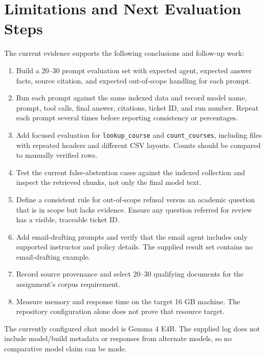 \documentclass[11pt,a4paper]{article}
\begin{document}
\section{Limitations and Next Evaluation Steps}
The current evidence supports the following conclusions and follow-up work:
\begin{enumerate}
  \item Build a 20--30 prompt evaluation set with expected agent, expected answer facts, source citation, and expected out-of-scope handling for each prompt.
  \item Run each prompt against the same indexed data and record model name, prompt, tool calls, final answer, citations, ticket ID, and run number. Repeat each prompt several times before reporting consistency or percentages.
  \item Add focused evaluation for \texttt{lookup\_course} and \texttt{count\_courses}, including files with repeated headers and different CSV layouts. Counts should be compared to manually verified rows.
  \item Test the current false-abstention cases against the indexed collection and inspect the retrieved chunks, not only the final model text.
  \item Define a consistent rule for out-of-scope refusal versus an academic question that is in scope but lacks evidence. Ensure any question referred for review has a visible, traceable ticket ID.
  \item Add email-drafting prompts and verify that the email agent includes only supported instructor and policy details. The supplied result set contains no email-drafting example.
  \item Record source provenance and select 20--30 qualifying documents for the assignment's corpus requirement.
  \item Measure memory and response time on the target 16 GB machine. The repository configuration alone does not prove that resource target.
\end{enumerate}

The currently configured chat model is Gemma 4 E4B. The supplied log does not include model/build metadata or responses from alternate models, so no comparative model claim can be made.
\end{document}
